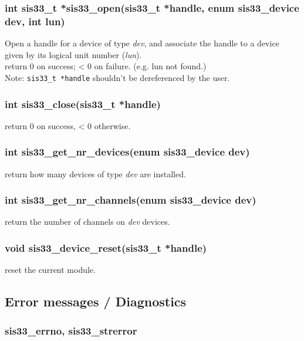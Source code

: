\documentclass[12pt,a4paper]{article}
\begin{document}
\subsubsection*{int sis33\_t *sis33\_open(sis33\_t *handle,
  enum sis33\_device dev, int lun)}
\label{sec-2.1.1}

Open a handle for a device of type \emph{dev}, and associate the
handle to a device given by its logical unit number (\emph{lun}). \\
return 0 on success; < 0 on failure. (e.g. lun not found.) \\
Note: \verb~sis33_t *handle~ shouldn't be dereferenced by the user.

\subsubsection*{int sis33\_close(sis33\_t *handle)}
\label{sec-2.1.2}

return 0 on success, < 0 otherwise.

\subsubsection*{int sis33\_get\_nr\_devices(enum sis33\_device dev)}
\label{sec-2.1.3}

return how many devices of type \emph{dev} are installed.

\subsubsection*{int sis33\_get\_nr\_channels(enum sis33\_device dev)}
\label{sec-2.1.4}

return the number of channels on \emph{dev} devices.

\subsubsection*{void sis33\_device\_reset(sis33\_t *handle)}
\label{sec-2.1.5}

reset the current module.

\subsection*{Error messages / Diagnostics}
\label{sec-2.2}

\subsubsection*{sis33\_errno, sis33\_strerror}
\label{sec-2.2.1}
\end{document}
